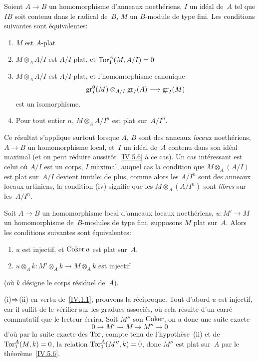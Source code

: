 \begin{theoreme}
\label{IV.5.6}
Soient $A\to B$ un homomorphisme d'anneaux noeth\'eriens, $I$ un
id\'eal de~$A$ tel que $IB$ soit contenu dans le radical de~$B$, $M$
un $B$-module de type fini. Les conditions suivantes sont
\'equivalentes:
\begin{enumerate}
\item[(i)] $M$ est $A$-plat
\item[(ii)] $M\otimes_A A/I$ est $A/I$-plat, et $\operatorname{Tor}_1^A(M,A/I)=0$
\item[(iii)] $M\otimes_A A/I$ est $A/I$-plat, et l'homomorphisme
canonique
$$
\gr_I^0(M)\otimes_{A/I}\gr_I(A)\to\gr_I(M)
$$
est un isomorphisme.
\item[(iv)] Pour tout entier $n$, $M\otimes_A A/I^n$ est plat
sur~$A/I^n$.
\end{enumerate}
\end{theoreme}

Ce r\'esultat s'applique surtout lorsque $A$, $B$ sont des anneaux
\emph{locaux} noeth\'eriens, $A\to B$ un homomorphisme local, et~$I$
un id\'eal de~$A$ contenu dans son id\'eal maximal (et on peut
r\'eduire aussit\^ot~\ref{IV.5.6} \`a ce cas). Un cas
int\'eressant est celui o\`u $A/I$ est un corps, \ie $I$ maximal,
auquel cas la condition que $M\otimes_A(A/I)$ est plat sur~$A/I$
devient inutile; de plus, comme alors les $A/I^n$ sont des anneaux
locaux artiniens, la condition (iv) signifie que les
$M\otimes_A(A/I^n)$ sont \emph{libres} sur les~$A/I^n$.

\begin{corollaire}
\label{IV.5.7}
Soit
$A\to B$ un homomorphisme local d'anneaux locaux noeth\'eriens,
$u\colon M'\to M$ un homomorphisme de~$B$-modules de type fini,
supposons $M$ plat sur~$A$. Alors les conditions suivantes sont
\'equivalentes:
\begin{enumerate}
\item[(i)] $u$ est injectif, et $\operatorname{Coker} u$ est plat sur~$A$.
\item[(ii)] $u\otimes_A k\colon M'\otimes_A k\to M\otimes_A k$ est
injectif
\end{enumerate}
(o\`u $k$ d\'esigne le corps r\'esiduel de~$A$).
\end{corollaire}

(i)$\To$(ii) en vertu de~\ref{IV.1.1}, prouvons la
r\'eciproque. Tout d'abord $u$ est injectif, car il suffit de le
v\'erifier sur les gradues associ\'es, o\`u cela r\'esulte
d'un carr\'e commutatif que le lecteur \'ecrira. Soit $M''$ son
$\operatorname{Coker}$, on a donc une suite exacte
$$
0\to M'\to M\to M''\to 0
$$
d'o\`u par la suite exacte des $\operatorname{Tor}$, compte tenu de
l'hypoth\`ese~(ii) et de~$\operatorname{Tor}_1^A(M,k)=0$, la relation
$\operatorname{Tor}_1^A(M'',k)=0$, donc $M''$ est plat sur~$A$ par le
th\'eor\`eme~\ref{IV.5.6}.

